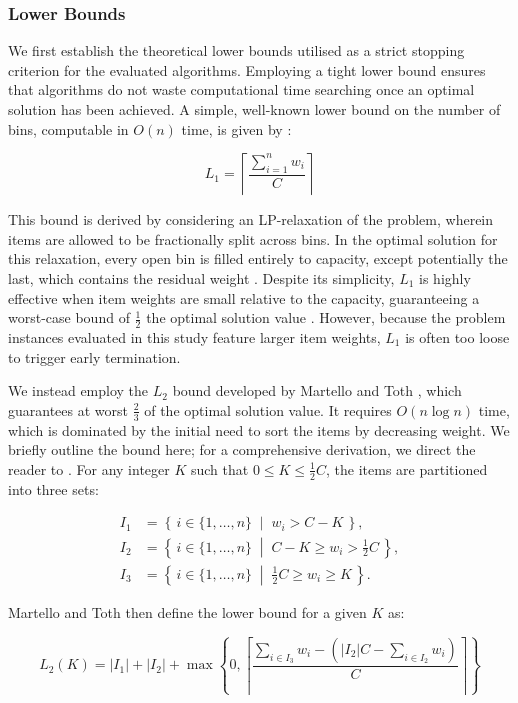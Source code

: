 \documentclass[11pt]{article}
\begin{document}
\subsubsection{Lower Bounds}

We first establish the theoretical lower bounds utilised as a strict stopping criterion for the evaluated algorithms. Employing a tight lower bound ensures that algorithms do not waste computational time searching once an optimal solution has been achieved. A simple, well-known lower bound on the number of bins, computable in $O(n)$ time, is given by \cite{martello}:

$$ L_1 = \left\lceil \frac{\sum_{i=1}^{n} w_i}{C} \right\rceil $$

This bound is derived by considering an LP-relaxation of the problem, wherein items are allowed to be fractionally split across bins. In the optimal solution for this relaxation, every open bin is filled entirely to capacity, except potentially the last, which contains the residual weight \cite{fekete}. Despite its simplicity, $L_1$ is highly effective when item weights are small relative to the capacity, guaranteeing a worst-case bound of $\frac{1}{2}$ the optimal solution value \cite{martello, fekete}. However, because the problem instances evaluated in this study feature larger item weights, $L_1$ is often too loose to trigger early termination.

We instead employ the $L_2$ bound developed by Martello and Toth \cite{martello}, which guarantees at worst $\frac{2}{3}$ of the optimal solution value. It requires $O(n \log n)$ time, which is dominated by the initial need to sort the items by decreasing weight. We briefly outline the bound here; for a comprehensive derivation, we direct the reader to \cite{martello}. For any integer $K$ such that $0 \le K \le \frac{1}{2} C$, the items are partitioned into three sets:

$$ \begin{aligned}
I_1 &= \left\{\, i \in \{1,\dots,n\} \;\middle|\; w_i > C - K \,\right\},\\
I_2 &= \left\{\, i \in \{1,\dots,n\} \;\middle|\; C - K \ge w_i > \tfrac{1}{2}C \,\right\},\\
I_3 &= \left\{\, i \in \{1,\dots,n\} \;\middle|\; \tfrac{1}{2}C \ge w_i \ge K \,\right\}.
\end{aligned} $$

Martello and Toth then define the lower bound for a given $K$ as:

$$ L_2(K)=|I_1|+|I_2|+\max\!\left\{0,\left\lceil
\frac{\sum_{i\in I_3}w_i-\left(|I_2|C-\sum_{i\in I_2}w_i\right)}{C}
\right\rceil\right\} $$
\end{document}
